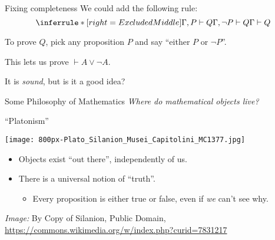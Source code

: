 \documentclass[xetex,aspectratio=169,14pt,hyperref={pdfpagelabels=true,pdflang={en-GB}}]{beamer}
\begin{document}
\begin{frame}
  {Fixing completeness}
  We could add the following rule:
  \begin{displaymath}
    \inferrule* [right=ExcludedMiddle]
    {\Gamma, P \vdash Q \\ \Gamma, \lnot P \vdash Q}
    {\Gamma \vdash Q}
  \end{displaymath}

  \pause
  \bigskip

  To prove $Q$, pick any proposition $P$ and say ``either $P$
  or $\lnot P$''.

  \bigskip
  \pause

  This lets us prove $\vdash A \lor \lnot A$.

  \bigskip
  \pause

  It is \emph{sound}, but is it a good idea?
\end{frame}

\begin{frame}
  {Some Philosophy of Mathematics}
  \emph{Where do mathematical objects live?}\\
\end{frame}

\begin{frame}
  {``Platonism''}

  \begin{center}
    \texttt{[image: 800px-Plato\_Silanion\_Musei\_Capitolini\_MC1377.jpg]}
  \end{center}

  \begin{itemize}
  \item Objects exist ``out there'', independently of us.
  \item There is a universal notion of ``truth''.
    \begin{itemize}
    \item Every proposition is either true or false, even if \emph{we}
      can't see why.
    \end{itemize}
  \end{itemize}

  {\tiny
    \emph{Image: }By Copy of Silanion, Public Domain, \url{https://commons.wikimedia.org/w/index.php?curid=7831217}}
\end{frame}
\end{document}
